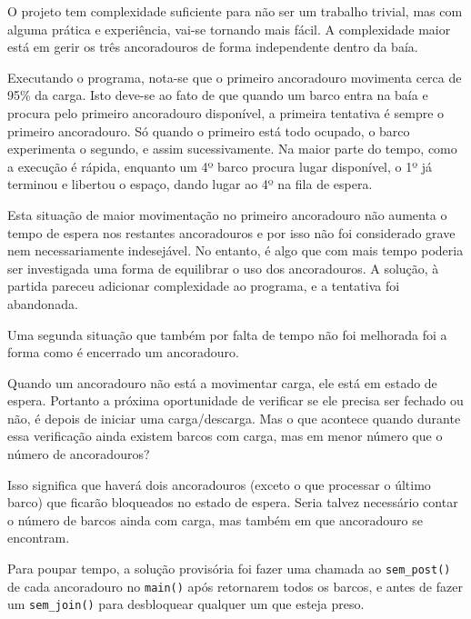 \documentclass[12pt,a4paper]{report}
\begin{document}

O projeto tem complexidade suficiente para não ser um trabalho trivial, mas com alguma prática e experiência, vai-se tornando mais fácil. A complexidade maior está em gerir os três ancoradouros de forma independente dentro da baía.


Executando o programa, nota-se que o primeiro ancoradouro movimenta cerca de 95\% da carga. Isto deve-se ao fato de que quando um barco entra na baía e procura pelo primeiro ancoradouro disponível, a primeira tentativa é sempre o primeiro ancoradouro. Só quando o primeiro está todo ocupado, o barco experimenta o segundo, e assim sucessivamente. Na maior parte do tempo, como a execução é rápida, enquanto um 4º barco procura lugar disponível, o 1º já terminou e libertou o espaço, dando lugar ao 4º na fila de espera.

Esta situação de maior movimentação no primeiro ancoradouro não aumenta o tempo de espera nos restantes ancoradouros e por isso não foi considerado grave nem necessariamente indesejável. No entanto, é algo que com mais tempo poderia ser investigada uma forma de equilibrar o uso dos ancoradouros. A solução, à partida pareceu adicionar complexidade ao programa, e a tentativa foi abandonada.


Uma segunda situação que também por falta de tempo não foi melhorada foi a forma como é encerrado um ancoradouro.

Quando um ancoradouro não está a movimentar carga, ele está em estado de espera. Portanto a próxima oportunidade de verificar se ele precisa ser fechado ou não, é depois de iniciar uma carga/descarga. Mas o que acontece quando durante essa verificação ainda existem barcos com carga, mas em menor número que o número de ancoradouros?

Isso significa que haverá dois ancoradouros (exceto o que processar o último barco) que ficarão bloqueados no estado de espera. Seria talvez necessário contar o número de barcos ainda com carga, mas também em que ancoradouro se encontram.

Para poupar tempo, a solução provisória foi fazer uma chamada ao \verb+sem_post()+ de cada ancoradouro no \verb+main()+ após retornarem todos os barcos, e antes de fazer um \verb+sem_join()+ para desbloquear qualquer um que esteja preso.
\end{document}
